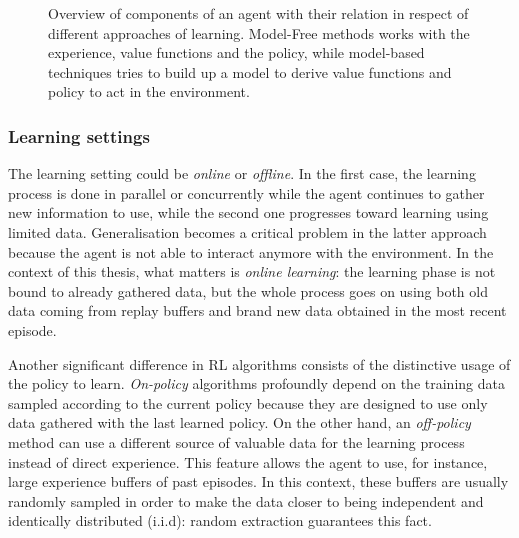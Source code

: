 \begin{figure}
	\centering
	\caption[Overview of different components in learning]{ Overview of components of an agent with their relation in respect of different approaches of learning. Model-Free methods works with the experience, value functions and the policy, while model-based techniques tries to build up a model to derive value functions and policy to act in the environment.}
	\label{fig:components}
\end{figure}

\subsubsection{Learning settings}

The learning setting could be \textit{online} or \textit{offline}. In the first case, the learning process is done in parallel or concurrently while the agent continues to gather new information to use, while the second one progresses toward learning using limited data.
Generalisation becomes a critical problem in the latter approach because the agent is not able to interact anymore with the environment.
In the context of this thesis, what matters is \textit{online learning}: the learning phase is not bound to already gathered data, but the whole process goes on using both old data coming from replay buffers and brand new data obtained in the most recent episode.

Another significant difference in RL algorithms consists of the distinctive usage of the policy to learn.
\textit{On-policy} algorithms profoundly depend on the training data sampled according to the current policy because they are designed to use only data gathered with the last learned policy.
On the other hand, an \textit{off-policy} method can use a different source of valuable data for the learning process instead of direct experience. This feature allows the agent to use, for instance, large experience buffers of past episodes. In this context, these buffers are usually randomly sampled in order to make the data closer to being independent and identically distributed (i.i.d): random extraction guarantees this fact.


